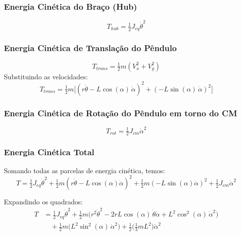 \documentclass[9pt,a4paper,twocolumn,twoside]{tau-class/tau}
\begin{document}
\subsubsection*{Energia Cinética do Braço (Hub)}
\begin{equation}
    T_{hub} = \tfrac{1}{2} J_{eq} \dot{\theta}^2
\end{equation}

\subsubsection*{Energia Cinética de Translação do Pêndulo}
\begin{equation}
    T_{trans} = \tfrac{1}{2} m (V_x^2 + V_y^2)
\end{equation}
Substituindo as velocidades:
\begin{equation}
    T_{trans} = \tfrac{1}{2} m \Big[ (r \dot{\theta} - L \cos(\alpha) \, \dot{\alpha})^2 + (-L \sin(\alpha) \, \dot{\alpha})^2 \Big]
\end{equation}

\subsubsection*{Energia Cinética de Rotação do Pêndulo em torno do CM}
\begin{equation}
    T_{rot} = \tfrac{1}{2} J_{cm} \dot{\alpha}^2
\end{equation}

\subsubsection*{Energia Cinética Total}

Somando todas as parcelas de energia cinética, temos:
\begin{equation}
    T = \tfrac{1}{2} J_{eq} \dot{\theta}^2 
        + \tfrac{1}{2} m (r \dot{\theta} - L \cos(\alpha) \dot{\alpha})^2
        + \tfrac{1}{2} m (-L \sin(\alpha) \dot{\alpha})^2
        + \tfrac{1}{2} J_{cm} \dot{\alpha}^2
    \label{eq:Ttotal1}
\end{equation}

Expandindo os quadrados:
\begin{align}
    T &= \tfrac{1}{2} J_{eq} \dot{\theta}^2 
        + \tfrac{1}{2} m \big(r^2 \dot{\theta}^2 - 2 r L \cos(\alpha) \, \dot{\theta}\dot{\alpha} + L^2 \cos^2(\alpha) \, \dot{\alpha}^2 \big) \nonumber \\
      &\quad + \tfrac{1}{2} m \big(L^2 \sin^2(\alpha) \, \dot{\alpha}^2\big)
        + \tfrac{1}{2} \Big(\tfrac{1}{3} m L^2\Big) \dot{\alpha}^2
    \label{eq:Ttotal2}
\end{align}
\end{document}
